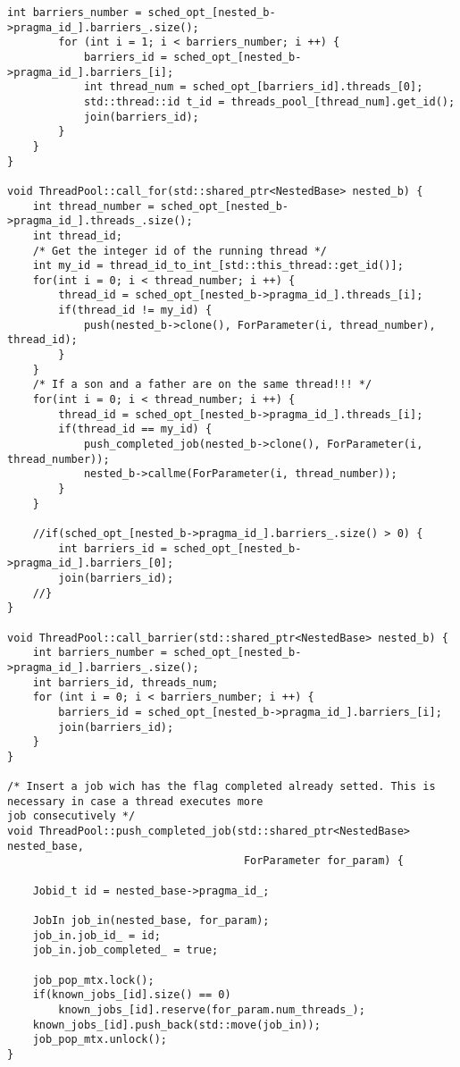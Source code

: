 \documentclass[a4paper,11pt,twoside]{book}
\begin{document}
\begin{lstlisting}[language=CCC, caption=thread\_pool.cpp]
        int barriers_number = sched_opt_[nested_b->pragma_id_].barriers_.size();
        for (int i = 1; i < barriers_number; i ++) {
            barriers_id = sched_opt_[nested_b->pragma_id_].barriers_[i];
            int thread_num = sched_opt_[barriers_id].threads_[0];
            std::thread::id t_id = threads_pool_[thread_num].get_id();
            join(barriers_id);
        }
    }
}

void ThreadPool::call_for(std::shared_ptr<NestedBase> nested_b) {
    int thread_number = sched_opt_[nested_b->pragma_id_].threads_.size();
    int thread_id;
    /* Get the integer id of the running thread */
    int my_id = thread_id_to_int_[std::this_thread::get_id()];
    for(int i = 0; i < thread_number; i ++) {
        thread_id = sched_opt_[nested_b->pragma_id_].threads_[i];
        if(thread_id != my_id) {
            push(nested_b->clone(), ForParameter(i, thread_number), thread_id);
        }
    }
    /* If a son and a father are on the same thread!!! */
    for(int i = 0; i < thread_number; i ++) {
        thread_id = sched_opt_[nested_b->pragma_id_].threads_[i];
        if(thread_id == my_id) {
            push_completed_job(nested_b->clone(), ForParameter(i, thread_number));
            nested_b->callme(ForParameter(i, thread_number));
        }
    }

    //if(sched_opt_[nested_b->pragma_id_].barriers_.size() > 0) {
        int barriers_id = sched_opt_[nested_b->pragma_id_].barriers_[0];
        join(barriers_id);
    //}
}

void ThreadPool::call_barrier(std::shared_ptr<NestedBase> nested_b) {
    int barriers_number = sched_opt_[nested_b->pragma_id_].barriers_.size();
    int barriers_id, threads_num;
    for (int i = 0; i < barriers_number; i ++) {
        barriers_id = sched_opt_[nested_b->pragma_id_].barriers_[i];
        join(barriers_id);
    }
}

/* Insert a job wich has the flag completed already setted. This is necessary in case a thread executes more
job consecutively */
void ThreadPool::push_completed_job(std::shared_ptr<NestedBase> nested_base,
                                     ForParameter for_param) {

    Jobid_t id = nested_base->pragma_id_;
        
    JobIn job_in(nested_base, for_param);
    job_in.job_id_ = id;
    job_in.job_completed_ = true;

    job_pop_mtx.lock();
    if(known_jobs_[id].size() == 0)
        known_jobs_[id].reserve(for_param.num_threads_);
    known_jobs_[id].push_back(std::move(job_in));
    job_pop_mtx.unlock();
}



\end{lstlisting}
\end{document}

